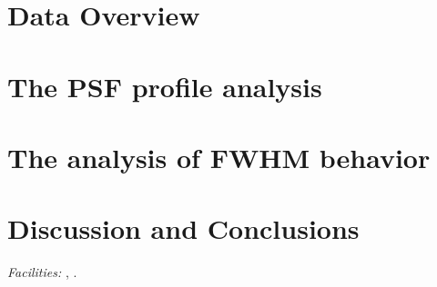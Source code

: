 \documentclass[12pt,preprint]{aastex}
\begin{document}
 

\section{Data Overview} 

 


\section{The PSF profile analysis}

 

\section{The analysis of FWHM behavior} 

 

\section{Discussion and Conclusions} 

 


\acknowledgments






{\it Facilities:} , .

\end{document}
